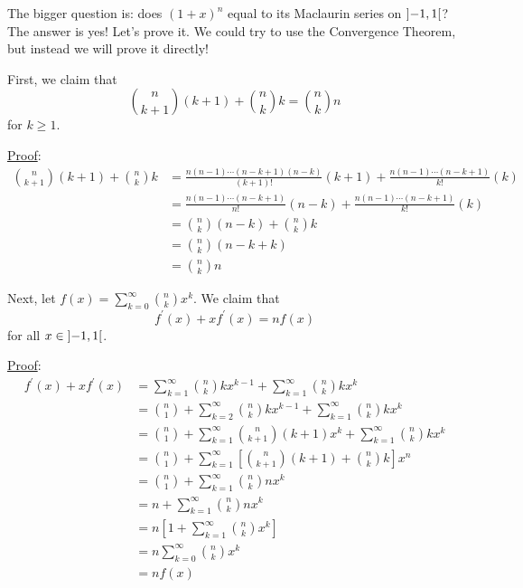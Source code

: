The bigger question is: does $ (1+x)^n $ equal to its Maclaurin
series on $ \interval[open]{-1}{1} $? The answer is yes! Let's prove it.
We could try to use the Convergence Theorem, but instead we will prove it directly!

First, we claim that
\[ \binom{n}{k+1}(k+1)+\binom{n}{k}k=\binom{n}{k}n \]
for $ k\geqslant 1 $.

\underline{Proof}:
\begin{align*}
    \binom{n}{k+1}(k+1)+\binom{n}{k}k
     & =\frac{n(n-1)\cdots(n-k+1)(n-k)}{(k+1)!}(k+1)
    +\frac{n(n-1)\cdots(n-k+1)}{k!}(k)               \\
     & =\frac{n(n-1)\cdots(n-k+1)}{n!}(n-k)
    +\frac{n(n-1)\cdots(n-k+1)}{k!}(k)               \\
     & =\binom{n}{k}(n-k)+\binom{n}{k}k              \\
     & =\binom{n}{k}(n-k+k)                          \\
     & =\binom{n}{k}n
\end{align*}

Next, let $ f(x)=\sum\limits_{k=0}^{\infty} \binom{n}{k}x^k $. We claim that
\[ f^\prime(x)+xf^\prime(x)=nf(x) \]
for all $ x\in\interval[open]{-1}{1} $.

\underline{Proof}:
\begin{align*}
    f^\prime(x)+xf^\prime(x)
     & =\sum\limits_{k=1}^{\infty} \binom{n}{k}k x^{k-1}+\sum\limits_{k=1}^{\infty}\binom{n}{k}
    k x^k                                                                                       \\
     & =\binom{n}{1}+\sum\limits_{k=2}^{\infty}
    \binom{n}{k}k x^{k-1}+\sum\limits_{k=1}^{\infty} \binom{n}{k}k x^k                          \\
     & =\binom{n}{1}+
    \sum\limits_{k=1}^{\infty} \binom{n}{k+1}(k+1)x^k+
    \sum\limits_{k=1}^{\infty} \binom{n}{k}k x^k                                                \\
     & =\binom{n}{1}+\sum\limits_{k=1}^{\infty}
    \left[ \binom{n}{k+1}(k+1)+\binom{n}{k}k \right]x^n                                         \\
     & =\binom{n}{1}+\sum\limits_{k=1}^{\infty} \binom{n}{k}n x^k                               \\
     & =n+\sum\limits_{k=1}^{\infty}\binom{n}{k}n x^k                                           \\
     & =n\left[ 1+\sum\limits_{k=1}^{\infty} \binom{n}{k}x^k \right]                            \\
     & =n \sum\limits_{k=0}^{\infty} \binom{n}{k}x^k                                            \\
     & =n f(x)
\end{align*}

